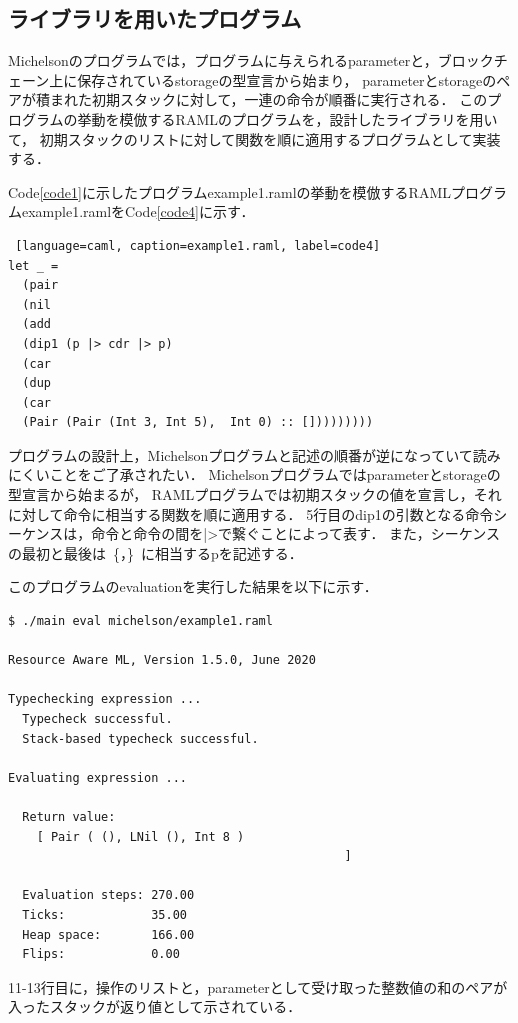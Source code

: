 \documentclass{kuisthesis}
\begin{document}
\subsection{ライブラリを用いたプログラム} \label{subsec-pro-pro}
Michelsonのプログラムでは，プログラムに与えられるparameterと，ブロックチェーン上に保存されているstorageの型宣言から始まり，
parameterとstorageのペアが積まれた初期スタックに対して，一連の命令が順番に実行される．
このプログラムの挙動を模倣するRAMLのプログラムを，設計したライブラリを用いて，
初期スタックのリストに対して関数を順に適用するプログラムとして実装する．

Code\ref{code1}に示したプログラムexample1.ramlの挙動を模倣するRAMLプログラムexample1.ramlをCode\ref{code4}に示す．

\begin{lstlisting} [language=caml, caption=example1.raml, label=code4]
let _ =
  (pair
  (nil
  (add
  (dip1 (p |> cdr |> p)
  (car
  (dup
  (car
  (Pair (Pair (Int 3, Int 5),  Int 0) :: []))))))))
\end{lstlisting}

プログラムの設計上，Michelsonプログラムと記述の順番が逆になっていて読みにくいことをご了承されたい．
Michelsonプログラムではparameterとstorageの型宣言から始まるが，
RAMLプログラムでは初期スタックの値を宣言し，それに対して命令に相当する関数を順に適用する．
5行目のdip1の引数となる命令シーケンスは，命令と命令の間を|>で繋ぐことによって表す．
また，シーケンスの最初と最後は\ \{，\}\ に相当するpを記述する．

このプログラムのevaluationを実行した結果を以下に示す．

\begin{lstlisting}[basicstyle={\ttfamily\color{base}\scriptsize}]
$ ./main eval michelson/example1.raml

Resource Aware ML, Version 1.5.0, June 2020

Typechecking expression ...
  Typecheck successful.
  Stack-based typecheck successful.

Evaluating expression ...

  Return value:
    [ Pair ( (), LNil (), Int 8 )
                                               ]

  Evaluation steps: 270.00
  Ticks:            35.00
  Heap space:       166.00
  Flips:            0.00
\end{lstlisting}

11-13行目に，操作のリストと，parameterとして受け取った整数値の和のペアが入ったスタックが返り値として示されている．
\end{document}
